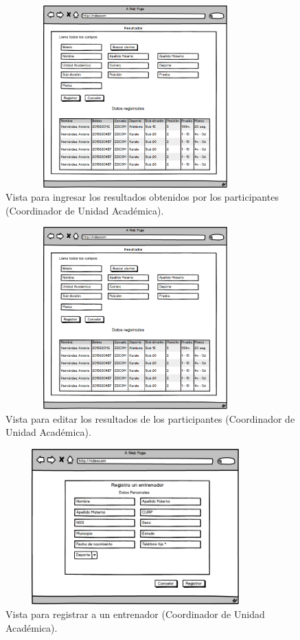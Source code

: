 		\begin{figure} [hbt!] 
			\centering
			\includegraphics[width=10cm, height=7cm]{Imagenes/Nuevos/P10_Ingresa_resultados}
			\caption{Vista para ingresar los resultados obtenidos por los participantes (Coordinador de Unidad Académica).}
			\label{ingresaresultados}
		\end{figure}
		
		\begin{figure} [hbt!]
			\centering
			\includegraphics[width=10cm, height=7cm]{Imagenes/Nuevos/P11_Editar_resultados}
			\caption{Vista para editar los resultados de los participantes (Coordinador de Unidad Académica).}
			\label{editaresultados}
		\end{figure}
		\pagebreak
		
		\begin{figure} [hbt!]
			\centering
			\includegraphics[width=10cm, height=6cm]{Imagenes/Nuevos/P12_Registro_entrenador}
			\caption{Vista para registrar a un entrenador (Coordinador de Unidad Académica).}
			\label{registroentrenador}
		\end{figure}
		
